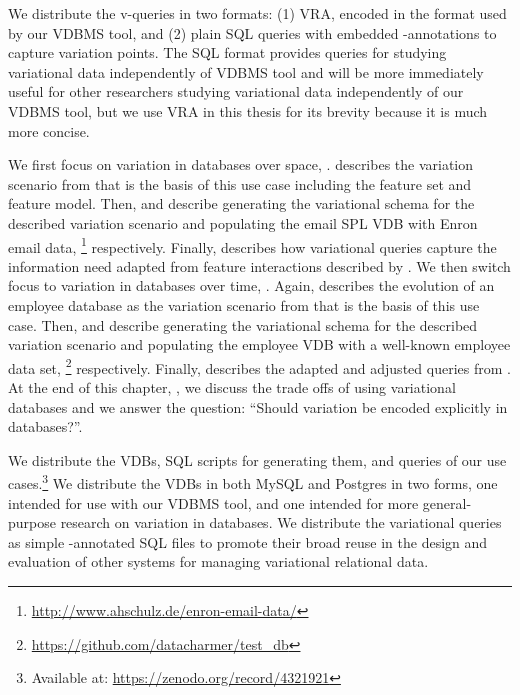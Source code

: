 We distribute the v-queries in two formats: (1) VRA,
encoded in the format used by
our VDBMS tool, and (2) plain SQL queries with embedded 
-annotations to capture variation points.
%
The SQL format provides queries for studying variational data 
independently of VDBMS tool and
will be more immediately useful for other researchers
studying variational data independently of our VDBMS tool, 
but we use VRA in
this thesis for its brevity
because it is much more concise.

We first focus on variation in databases over space, 
.  describes the
variation scenario from \citet{Hall05} that is the basis of this use case including the feature set and
feature model. Then,  and  describe generating the variational schema for the described
variation scenario and populating the email SPL VDB with Enron email data,%
\footnote{\url{http://www.ahschulz.de/enron-email-data/}} respectively.
Finally,  describes how variational queries capture the information need 
adapted from feature interactions described by \citet{Hall05}.
%
We then switch focus to variation in databases over time,
. Again,  describes the
evolution of an employee database as the variation scenario from \citet{prima08Moon} 
that is the basis of this use case.
Then,  and  describe generating the variational 
schema for the described
variation scenario and populating the employee VDB with a well-known employee data set,%
\footnote{\url{https://github.com/datacharmer/test_db}} respectively.
Finally,  describes the adapted and adjusted queries from \citet{prima08Moon}. 
%
At the end of this chapter, , we discuss the trade offs of using variational databases and
we answer the question: ``Should variation be encoded explicitly in databases?''.

We distribute the VDBs, SQL scripts for generating them, and queries of our
use cases.\footnote{Available at: \url{https://zenodo.org/record/4321921}}
%
We distribute the VDBs in both MySQL and Postgres in two forms, one intended
for use with our VDBMS tool, and one intended for more general-purpose research
on variation in databases.
%
%
We distribute the variational queries as simple -annotated SQL files
to promote their broad reuse in the design and evaluation of other systems for
managing variational relational data.

%







